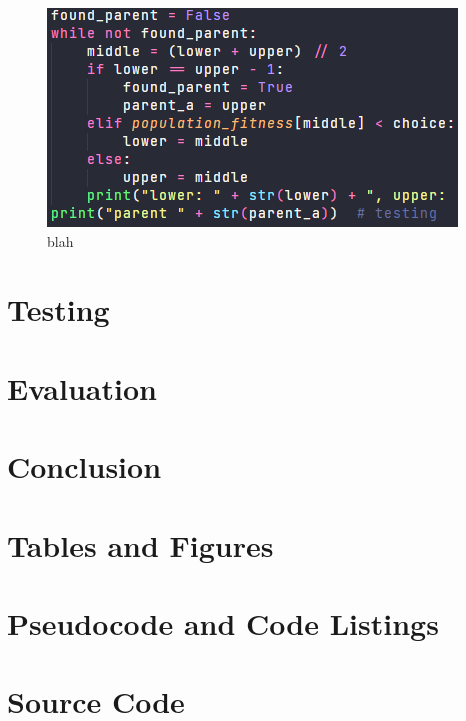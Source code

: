 \documentclass[a4paper, 12pt]{report}
\begin{document}
\begin{figure}[ht]
	\centering
	\includegraphics{images/binary-search-4}
	\caption{blah}  %
	\label{fig:code-3}
\end{figure}




\chapter{Testing}  %

\chapter{Evaluation}  %

\chapter{Conclusion}  %

\renewcommand\bibname{References}


\appendix

\chapter{Tables and Figures} %

\chapter{Pseudocode and Code Listings} %

\chapter{Source Code}
\end{document}
